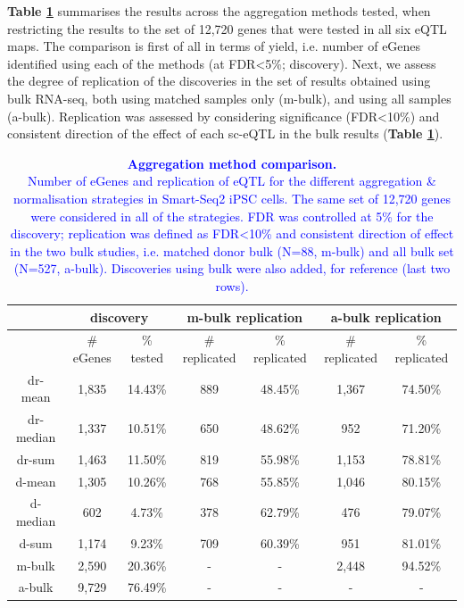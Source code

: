 
\textbf{Table \ref{tab:egenes}} summarises the results across the aggregation methods tested, when restricting the results to the set of 12,720 genes that were tested in all six eQTL maps.
The comparison is first of all in terms of yield, i.e. number of eGenes identified using each of the methods (at FDR<5\%; discovery).
Next, we assess the degree of replication of the discoveries in the set of results obtained using bulk RNA-seq, both using matched samples only (m-bulk), and using all samples (a-bulk).
Replication was assessed by considering significance (FDR<10\%) and consistent direction of the effect of each sc-eQTL in the bulk results (\textbf{Table \ref{tab:egenes}}).\\

\begin{table}[h]
    \centering
    \begin{tabular}{c|c c|c c|c c}
    & \multicolumn{2}{c}{discovery}&\multicolumn{2}{c}{m-bulk replication} &\multicolumn{2}{c}{a-bulk replication}\\
    \hline
    & \# eGenes & \% tested & \# replicated & \% replicated & \# replicated & \% replicated \\
    \hline
    dr-mean   &  1,835 & 14.43\% & 889 & 48.45\% & 1,367 & 74.50\% \\
    dr-median &  1,337 & 10.51\% & 650 & 48.62\% &   952 & 71.20\% \\
    dr-sum    &  1,463 & 11.50\% & 819 & 55.98\% & 1,153 & 78.81\% \\
    d-mean    &  1,305 & 10.26\% & 768 & 55.85\% & 1,046 & 80.15\% \\
    d-median  &    602 &  4.73\% & 378 & 62.79\% &   476 & 79.07\% \\
    d-sum     &  1,174 &  9.23\% & 709 & 60.39\% &   951 & 81.01\% \\
    \hline
    m-bulk    &  2,590 & 20.36\% & - & - & 2,448 & 94.52\% \\
    a-bulk    &  9,729 & 76.49\% & - & - & - & - \\
    \end{tabular}
    \caption[Aggregation method comparison]{\textcolor{blue}{\textcolor{blue}{\textbf{Aggregation method comparison.}\\
    Number of eGenes and replication of eQTL for the different aggregation \& normalisation strategies in Smart-Seq2 iPSC cells. 
    The same set of 12,720 genes were considered in all of the strategies.
    FDR was controlled at 5\% for the discovery; replication was defined as FDR<10\% and consistent direction of effect in the two bulk studies, i.e. matched donor bulk (N=88, m-bulk) and all bulk set (N=527, a-bulk).
    Discoveries using bulk were also added, for reference (last two rows).}}}
    \label{tab:egenes}
\end{table}



